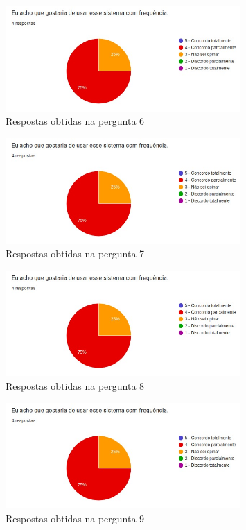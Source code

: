 \documentclass[12pt]{tcc}
\begin{document}
	\begin{figure}[!ht]
		\centering
		\includegraphics[width=0.8\textwidth]{figures/respostas-pergunta-6.jpeg}
		\caption{Respostas obtidas na pergunta 6}
		\label{fig:respostas-pergunta-6}
	\end{figure}

	\begin{figure}[!ht]
		\centering
		\includegraphics[width=0.8\textwidth]{figures/respostas-pergunta-7.jpeg}
		\caption{Respostas obtidas na pergunta 7}
		\label{fig:respostas-pergunta-7}
	\end{figure}


	\begin{figure}[!ht]
		\centering
		\includegraphics[width=0.8\textwidth]{figures/respostas-pergunta-8.jpeg}
		\caption{Respostas obtidas na pergunta 8}
		\label{fig:respostas-pergunta-8}
	\end{figure}

	\begin{figure}[!ht]
		\centering
		\includegraphics[width=0.8\textwidth]{figures/respostas-pergunta-9.jpeg}
		\caption{Respostas obtidas na pergunta 9}
		\label{fig:respostas-pergunta-9}
	\end{figure}
\end{document}

